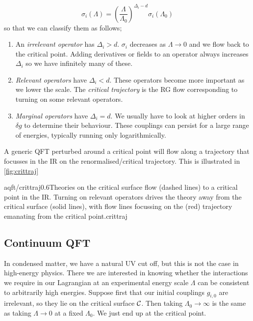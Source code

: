 \begin{equation*}
\sigma_i(\Lambda) = \left(\frac{\Lambda}{\Lambda_0}\right)^{\Delta_i - d}\sigma_i(\Lambda_0)
\end{equation*}
so that we can classify them as follows;
\begin{enumerate}
\item An \emph{irrelevant operator} has $\Delta_i > d$. $\sigma_i$ decreases as $\Lambda \rightarrow 0$ and we flow back to the critical point. Adding derivatives or fields to an operator always increases $\Delta_i$ so we have infinitely many of these.
\item \emph{Relevant operators} have $\Delta_i < d$. These operators become more important as we lower the scale. The \emph{critical trajectory} is the RG flow corresponding to turning on some relevant operators.
\item \emph{Marginal operators} have $\Delta_i = d$. We usually have to look at higher orders in $\delta g$ to determine their behaviour. These couplings can persist for a large range of energies, typically running only logarithmically.
\end{enumerate}
A generic QFT perturbed around a critical point will flow along a trajectory that focusses in the IR on the renormalised/critical trajectory. This is illustrated in \autoref{fig:crittraj}
\begin{mygraphic}{aqft/crittraj}{0.6}{Theories on the critical surface flow (dashed lines) to a critical point in the IR. Turning on relevant operators drives the theory away from the critical surface (solid lines), with flow lines focussing on the (red) trajectory emanating from the critical point.}{crittraj}\end{mygraphic}
\subsection{Continuum QFT}
In condensed matter, we have a natural UV cut off, but this is not the case in high-energy physics. There we are interested in knowing whether the interactions we require in our Lagrangian at an experimental energy scale $\Lambda$ can be consistent to arbitrarily high energies. Suppose first that our initial couplings $g_{i,0}$ are irrelevant, so they lie on the critical surface $\mathcal{C}$. Then taking $\Lambda_0 \rightarrow \infty$ is the same as taking $\Lambda \rightarrow 0$ at a fixed $\Lambda_0$. We just end up at the critical point. 

